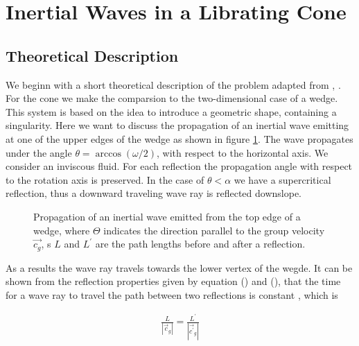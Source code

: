 \section{Inertial Waves in a Librating Cone}
\label{cone:theorie_exp}

\subsection{Theoretical Description}

We beginn with a short theoretical description of the problem adapted from \citep{Greenspan1969}, \citep{Beardsley1970}.
For the cone we make the comparsion to the two-dimensional case of a wedge.
This system is based on the idea to introduce a geometric shape, containing a singularity.
Here we want to discuss the propagation of an inertial wave emitting at one of the upper edges of
the wedge as shown in figure \ref{cone:theorie}.
The wave propagates under the angle $\theta = \arccos(\omega/2)$, with respect to the horizontal axis.
We consider an inviscous fluid.
For each reflection the propagation angle with respect to the rotation axis is preserved.
In the case of $\theta<\alpha$ we have a supercritical reflection,
thus a downward traveling wave ray is reflected downslope.

\begin{figure}[!bp]
  \begin{minipage}[c]{0.6\textwidth}
      \centering
  \end{minipage}
  \begin{minipage}[c]{0.3\textwidth}
      \caption{
          Propagation of an inertial wave emitted from the top edge of a wedge,
           where $\Theta$ indicates the direction parallel to the group velocity
            $\vec{c_g}$, s $L$ and $L^{\prime}$ are the path lengths before and after a reflection.
      \label{cone:theorie}
      }
  \end{minipage}
\end{figure}

As a results the wave ray travels towards the lower vertex of the wegde.
It can be shown from the reflection properties given by equation () and (),
that the time for a wave ray to travel the path between two reflections is constant \citep{Beardsley1970},
which is

\begin{align}
    \frac{L}{|\vec{c}_g|} = \frac{L^{\prime}}{|\vec{c^{\prime}}_g|}
\end{align}

